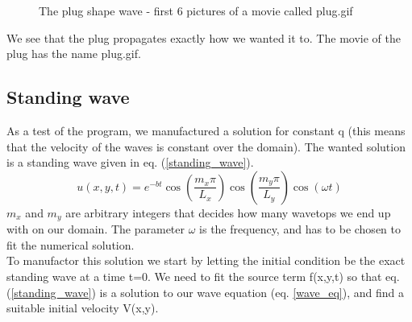 \begin{figure}[H]
 \caption{The plug shape wave - first 6 pictures of a movie called plug.gif}
 \label{fig_plug}
 
\end{figure}

We see that the plug propagates exactly how we wanted it to. The movie of the plug has the name plug.gif.

\subsection{Standing wave}
As a test of the program, we manufactured a solution for constant q (this means that the velocity of the waves is constant over the domain). The wanted solution
is a standing wave given in eq. (\ref{standing_wave}).
\begin{equation}
 u(x,y,t) = e^{-bt} \cos(\frac{m_x \pi}{L_x}) \cos(\frac{m_y \pi}{L_y}) \cos(\omega t)
 \label{standing_wave}
\end{equation}
$m_x$ and $m_y$ are arbitrary integers that decides how many wavetops we end up with on our domain. The parameter $\omega$
is the frequency, and has to be chosen to fit the numerical solution.\\
To manufactor this solution we start by letting the initial condition be the exact standing wave at a time t=0. We need to fit the source term f(x,y,t) so that eq. (\ref{standing_wave})
is a solution to our wave equation (eq. \ref{wave_eq}), and find a suitable initial velocity V(x,y). 


